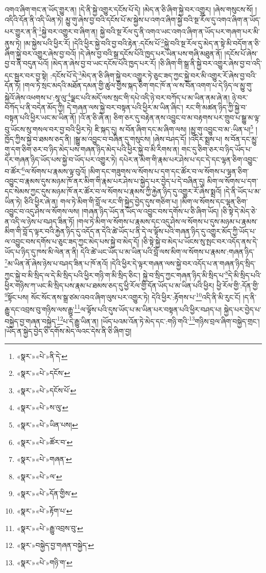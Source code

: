 འགའ་ཞིག་གང་ན་ཡོད་གྱུར་ན། །དེ་ནི་སྐྱེ་འགྱུར་དངོས་པོ་དེ། །མེད་ན་ཅི་ཞིག་སྐྱེ་བར་འགྱུར། །ཞེས་གསུངས་སོ། །འདིའི་དོན་ནི་འདི་ཡིན་ཏེ། མྱུ་གུ་ཞེས་བྱ་བའི་དངོས་པོ་མ་སྐྱེས་པ་འགའ་ཞིག་སྐྱེ་བའི་སྔ་རོལ་དུ་འགའ་ཞིག་ན་ཡོད་པར་གྱུར་ན་ནི་\footnote{«སྣར་»«པེ་»ནི་དེ་}སྐྱེ་བར་འགྱུར་བ་ཞིག་ན། སྐྱེ་བའི་སྔ་རོལ་དུ་ནི་འགའ་ཡང་འགའ་ཞིག་ན་ཡོད་པར་གཞག་པར་མི་ནུས་ཏེ། །མ་སྐྱེས་པའི་ཕྱིར་རོ། །དེའི་ཕྱིར་སྐྱེ་བའི་བྱ་བའི་རྟེན་:དངོས་པོ་\footnote{«སྣར་»«པེ་»དངོས་}སྐྱེ་བའི་སྔ་རོལ་དུ་མེད་ན་སྟེ་མི་བདོག་ན་ཅི་ཞིག་སྐྱེ་བར་འགྱུར་ཞེས་བྱ་བའོ། །དེ་ཞེས་བྱ་བའི་སྒྲ་དངོས་པོའི་ཁྱད་པར་ཡིན་པས་གཞི་མཐུན་ནོ། །དངོས་པོ་ཞེས་བྱ་བ་ནི་བདུན་པའོ། །མེད་ན་ཞེས་བྱ་བ་ཡང་དངོས་པོའི་ཁྱད་པར་རོ། །ཅི་ཞིག་གི་སྒྲ་ནི་སྐྱེ་བར་འགྱུར་ཞེས་བྱ་བ་འདི་དང་སྦྱར་བར་བྱ་སྟེ། :དངོས་པོ་དེ་\footnote{«སྣར་»«པེ་»དངོས་པོ་}མེད་ན་ཅི་ཞིག་སྐྱེ་བར་འགྱུར་ཏེ་ཅུང་ཟད་ཀྱང་སྐྱེ་བར་མི་འགྱུར་རོ་ཞེས་བྱ་བའི་དོན་ཏོ། །གལ་ཏེ་སྲང་མདའི་མཐོན་དམན་གྱི་ཚུལ་གྱིས་སྐད་ཅིག་གང་ཁོ་ན་ལ་ས་བོན་འགག་པ་དེ་ཉིད་ལ་མྱུ་གུ་སྐྱེའོ་ཞེས་འཕགས་པ་:སཱ་ལུ་\footnote{«སྣར་»«པེ་»ས་ལུ་}ལྗང་པའི་མདོ་ལས་སྲང་གི་དཔེ་འདི་ཉེ་བར་བཀོད་པ་མ་ཡིན་ནམ་ཞེ་ན། ཉེ་བར་བཀོད་པ་ནི་བདེན་མོད་ཀྱི། དེ་གཞན་ལས་སྐྱེ་བར་བསྟན་པའི་ཕྱིར་མ་ཡིན་ཞིང་། རང་གི་མཚན་ཉིད་ཀྱི་སྐྱེ་བ་བསྟན་པའི་ཕྱིར་ཡང་མ་ཡིན་ནོ། །འོ་ན་ཅི་ཞེ་ན། ཅིག་ཅར་དུ་བརྟེན་ནས་འབྱུང་བ་མ་བརྟགས་པར་གྲུབ་པ་སྒྱུ་མ་ལྟ་བུ་ཡོངས་སུ་གསལ་བར་བྱ་བའི་ཕྱིར་ཏེ། ཇི་སྐད་དུ། ས་བོན་ཞིག་དང་མ་ཞིག་ལས། །མྱུ་གུ་འབྱུང་བ་མ་:ཡིན་པ།\footnote{«སྣར་»«པེ་»ཡིན་པས།} །ཁྱོད་ཀྱིས་སྐྱེ་བ་ཐམས་ཅད་ནི། །སྒྱུ་མ་འབྱུང་བ་བཞིན་དུ་གསུངས། །ཞེས་བཤད་དོ། །འདིར་སྨྲས་པ། ས་བོན་དང་མྱུ་གུ་དག་ཅིག་ཅར་བ་ཉིད་མེད་པས་གཞན་ཉིད་མེད་པའི་ཕྱིར་སྐྱེ་བ་མི་རིགས་ན། གང་དུ་ཅིག་ཅར་བ་ཉིད་ཡོད་པ་དེར་གཞན་ཉིད་ཡོད་པས་སྐྱེ་བ་ཡོད་པར་འགྱུར་ཏེ། དཔེར་ན་མིག་གི་རྣམ་པར་ཤེས་པ་དང་དེ་དང་ལྷན་ཅིག་འབྱུང་བ་ཚོར་\footnote{«སྣར་»«པེ་»ཚོར་བ་}ལ་སོགས་པ་རྣམས་ལྟ་བུའོ། །མིག་དང་གཟུགས་ལ་སོགས་པ་དག་དང་ཚོར་བ་ལ་སོགས་པ་ལྷན་ཅིག་འབྱུང་བ་རྣམས་དུས་མཉམ་ཁོ་ནར་མིག་གི་རྣམ་པར་ཤེས་པ་སྐྱེད་པར་བྱེད་པ་དེ་བཞིན་དུ། མིག་ལ་སོགས་པ་དག་དང་སེམས་ཀྱང་དུས་མཉམ་ཁོ་ནར་ཚོར་བ་ལ་སོགས་པ་རྣམས་ཀྱི་རྐྱེན་ཉིད་དུ་འགྱུར་རོ་ཞེས་སྨྲའོ། །དེ་ནི་ཡོད་པ་མ་ཡིན་ཏེ། ཅིའི་ཕྱིར་ཞེ་ན། གལ་ཏེ་མིག་གི་བློ་ལ་རང་གི་སྐྱེད་བྱེད་དུས་གཅིག་པ། །མིག་ལ་སོགས་དང་ལྷན་ཅིག་འབྱུང་བ་འདུ་ཤེས་ལ་སོགས་ལས། །གཞན་ཉིད་ཡོད་ན་ཡོད་ལ་འབྱུང་བས་དགོས་པ་ཅི་ཞིག་ཡོད། །ཅི་སྟེ་དེ་མེད་ཅེ་ན་འདི་ལ་ཉེས་པ་བཤད་ཟིན་ཏོ། །གལ་ཏེ་མིག་ལ་སོགས་པ་རྣམས་དང་འདུ་ཤེས་ལ་སོགས་པ་དུས་མཉམ་པ་རྣམས་མིག་གི་བློ་ད་ལྟར་བའི་རྐྱེན་ཉིད་དུ་འདོད་ན་དེའི་ཚེ་ཡོད་པ་ནི་དེ་ལ་ལྟོས་པའི་གཞན་ཉིད་དུ་འགྱུར་མོད་ཀྱི་ཡོད་པ་ལ་འབྱུང་བས་དགོས་པ་ཅུང་ཟད་ཀྱང་མེད་པས་སྐྱེ་བ་མེད་དོ། །ཅི་སྟེ་སྐྱེ་བ་མེད་པ་ཡོངས་སུ་སྤང་བར་འདོད་ནས་དེ་ཡོད་པ་ཉིད་དུ་ཁས་མི་ལེན་ན་ནི། དེའི་ཚེ་ཡང་ཡོད་པ་མ་ཡིན་པའི་བློ་ལས་མིག་ལ་སོགས་པ་རྣམས་:གཞན་ཉིད་\footnote{«སྣར་»«པེ་»གཞན་}མ་ཡིན་ནོ་ཞེས་ཉེས་པ་བཤད་ཟིན་པ་ཁོ་ནའོ། །དེའི་ཕྱིར་དེ་ལྟར་གཞན་ལས་སྐྱེ་བར་འདོད་པ་ན་གཞན་ཉིད་སྲིད་ཀྱང་སྐྱེ་བ་མི་སྲིད་ལ་དེ་མི་སྲིད་པའི་ཕྱིར་གཉི་ག་མི་སྲིད་ཅིང་། སྐྱེ་བ་སྲིད་ཀྱང་གཞན་ཉིད་མི་སྲིད་པ་\footnote{«སྣར་»«པེ་»ལ་}དེ་མི་སྲིད་པའི་ཕྱིར་གཉིས་ཀ་ཡང་མི་སྲིད་པས་རྣམ་པ་ཐམས་ཅད་དུ་ཕྱི་རོལ་གྱི་དོན་ཡོད་པ་མ་ཡིན་པའི་ཕྱིར། ཕྱི་རོལ་གྱི་:དོན་གྱི་\footnote{«སྣར་»«པེ་»དོན་གྱིས་}སྟོང་པས། སོང་སོང་ནས་སྒྲ་ཙམ་འབའ་ཞིག་ལུས་པར་འགྱུར་ཏེ། དེའི་ཕྱིར་:རྟོགས་པ་\footnote{«སྣར་»«པེ་»རྟོག་པ་}འདི་ནི་མི་རུང་ངོ། །ད་ནི་རྒྱུ་དང་འབྲས་བུ་གཉིས་ལས་རྒྱུ་\footnote{«སྣར་»«པེ་»རྒྱུ་འབྲས་བུ་}ལ་ལྟོས་པའི་དུས་ཡོད་པ་མ་ཡིན་པར་བསྟན་པའི་ཕྱིར་བཤད་པ། སྐྱེད་པར་བྱེད་པ་བསྐྱེད་བྱ་གཞན་བསྐྱེད་\footnote{«སྣར་»བསྐྱེད་བྱ་གཞན་བསྐྱེད་}པ་དེ་རྒྱུ་ཡིན་ན། །ཡོད་པའམ་འོན་ཏེ་མེད་དང་:གཉི་གའི་\footnote{«སྣར་»«པེ་»གཉི་ག་}གཉིས་བྲལ་ཞིག་བསྐྱེད་གྲང་། །ཡོད་ན་སྐྱེད་བྱེད་ཅི་དགོས་མེད་ལའང་དེས་ནི་ཅི་ཞིག་བྱ། 